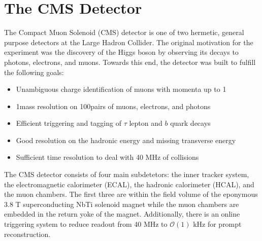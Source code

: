 \chapter{The CMS Detector}
\label{sec:cms}

The Compact Muon Solenoid (CMS) detector is one of two hermetic, general purpose detectors at the Large Hadron Collider.
The original motivation for the experiment was the discovery of the Higgs boson by observing its decays to photons, electrons, and muons.
Towards this end, the detector was built to fulfill the following goals:
\begin{itemize}
\item Unambiguous charge identification of muons with momenta up to 1\TeV
\item 1\GeV mass resolution on 100\GeV pairs of muons, electrons, and photons
\item Efficient triggering and tagging of $\tau$ lepton and $b$ quark decays
\item Good resolution on the hadronic energy and missing transverse energy
\item Sufficient time resolution to deal with 40 MHz of collisions
\end{itemize}
The CMS detector consists of four main subdetetors: the inner tracker system, the electromagnetic calorimeter (ECAL), the hadronic calorimeter (HCAL), and the muon chambers.
The first three are within the field volume of the eponymous 3.8 T superconducting NbTi solenoid magnet while the muon chambers are embedded in the return yoke of the magnet.
Additionally, there is an online triggering system to reduce readout from 40 MHz to $\mathcal{O}(1)$ kHz for prompt reconstruction. 

